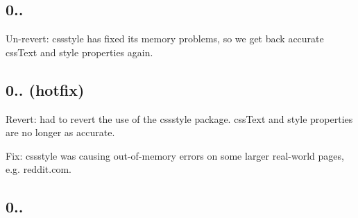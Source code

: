 \subsection*{0..}


\begin{DoxyItemize}
\item Un-\/revert\+: cssstyle has fixed its memory problems, so we get back accurate {\ttfamily css\+Text} and {\ttfamily style} properties again.
\end{DoxyItemize}

\subsection*{0.. (hotfix)}


\begin{DoxyItemize}
\item Revert\+: had to revert the use of the cssstyle package. {\ttfamily css\+Text} and {\ttfamily style} properties are no longer as accurate.
\item Fix\+: cssstyle was causing out-\/of-\/memory errors on some larger real-\/world pages, e.\+g. reddit.\+com.
\end{DoxyItemize}

\subsection*{0..}


